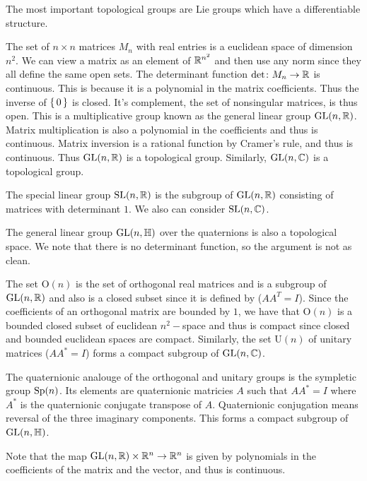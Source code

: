 \documentclass[letterpaper, 11pt, oneside]{book}
\begin{document}
\clearpage

The most important topological groups are Lie groups which have a differentiable structure.

\begin{ex}
  The set of $n \times n$ matrices $M_{n}$ with real entries is a euclidean space of dimension $n^{2}$.
  We can view a matrix as an element of $\mathbb{R}^{n^{2}}$ and then use any norm since they all define the same open sets.
  The determinant function $\det\colon M_{n} \to \mathbb{R}$ is continuous.
  This is because it is a polynomial in the matrix coefficients.
  Thus the inverse of $\set{0}$ is closed.
  It's complement, the set of nonsingular matrices, is thus open.
  This is a multiplicative group known as the general linear group $\operatorname{GL}(n, \mathbb{R})$.
  Matrix multiplication is also a polynomial in the coefficients and thus is continuous.
  Matrix inversion is a rational function by Cramer's rule, and thus is continuous.
  Thus $\operatorname{GL}(n, \mathbb{R})$ is a topological group.
  Similarly, $\operatorname{GL}(n, \mathbb{C})$ is a topological group.

  The special linear group $\operatorname{SL}(n, \mathbb{R})$ is the subgroup of $\operatorname{GL}(n, \mathbb{R})$ consisting of matrices with determinant $1$.
  We also can consider $\operatorname{SL}(n, \mathbb{C})$.

  The general linear group $\operatorname{GL}(n, \mathbb{H})$ over the quaternions is also a topological space.
  We note that there is no determinant function, so the argument is not as clean.

  The set $\text{O}(n)$ is the set of orthogonal real matrices and is a subgroup of $\operatorname{GL}(n, \mathbb{R})$ and also is a closed subset since it is defined by  ($A A^{T} = I$).
  Since the coefficients of an orthogonal matrix are bounded by $1$, we have that $\text{O}(n)$ is a bounded closed subset of euclidean $n^{2}-$space and thus is compact since closed and bounded euclidean spaces are compact.
  Similarly, the set $\text{U}(n)$ of unitary matrices ($A A^{*} = I$) forms a compact subgroup of $\operatorname{GL}(n, \mathbb{C})$.

  The quaternionic analouge of the orthogonal and unitary groups is the sympletic group $\operatorname{Sp}(n)$.
  Its elements are quaternionic matricies $A$ such that $A A^{*} = I$ where $A^{*}$ is the quaternionic conjugate transpose of $A$.
  Quaternionic conjugation means reversal of the three imaginary components.
  This forms a compact subgroup of $\operatorname{GL}(n, \mathbb{H})$.
\end{ex}

Note that the map $\operatorname{GL}(n, \mathbb{R}) \times \mathbb{R}^{n} \to \mathbb{R}^{n}$ is given by polynomials in the coefficients of the matrix and the vector, and thus is continuous.
\end{document}
